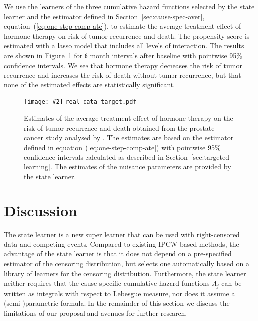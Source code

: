 \documentclass[11pt]{article}
\theoremstyle{thmstyleone}%
\theoremstyle{thmstyletwo}%
\theoremstyle{thmstylethree}%
\newcommand{\includeFigCond}[2][]{
  \ifx\nofig\undefined %
    \texttt{[image: \#2]} %
  \else %
    \texttt{#2} %
  \fi %
}
\newcommand{\1}{\mathds{1}}
\begin{document}
We use the learners of the three cumulative hazard functions selected
by the state learner and the estimator defined in
Section~\ref{sec:cause-spec-aver},
equation~(\ref{eq:one-step-comp-ate}), to estimate the average
treatment effect of hormone therapy on risk of tumor recurrence and
death. The propensity score is estimated with a lasso model that
includes all levels of interaction.
The results are shown in Figure~\ref{fig:zelefski-real-target} for 6
month intervals after baseline with pointwise 95\% confidence
intervals. We see that hormone therapy decreases the risk of tumor
recurrence and increases the risk of death without tumor recurrence,
but that none of the estimated effects are statistically significant.

\begin{figure}
  \centering%
  \includeFigCond[width=1\linewidth]{real-data-target.pdf}
  \caption[]{Estimates of the average treatment effect of hormone therapy on the
    risk of tumor recurrence and death obtained from the prostate cancer study
    analysed by \cite{kattan2000pretreatment}. The estimates are based on the
    estimator defined in equation~(\ref{eq:one-step-comp-ate}) with pointwise
    95\% confidence intervals calculated as described in
    Section~\ref{sec:targeted-learning}. The estimates of the nuisance
    parameters are provided by the state learner.}
  \label{fig:zelefski-real-target}
\end{figure}



\section{Discussion}
\label{sec:discussion}

The state learner is a new super learner that can be used with
right-censored data and competing events. Compared to existing
IPCW-based methods, the advantage of the state learner is that it does
not depend on a pre-specified estimator of the censoring distribution,
but selects one automatically based on a library of learners for the
censoring distribution. Furthermore, the state learner neither
requires that the cause-specific cumulative hazard functions
\( \Lambda_j \) can be written as integrals with respect to Lebesgue
measure, nor does it assume a (semi-)parametric formula. In the
remainder of this section we discuss the limitations of our proposal
and avenues for further research.
\end{document}
